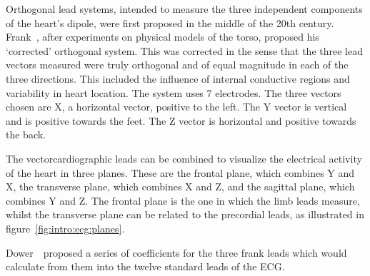 Orthogonal lead systems, intended to measure the three independent components of
the heart's dipole, were first proposed in the middle of the 20th century.
Frank~\cite{Frank1956}, after experiments on physical models of the torso,
proposed his `corrected' orthogonal system.
This was corrected in the sense that the three lead vectors measured were
truly orthogonal and of equal magnitude in each of the three directions.
This included the influence of internal conductive regions and variability in
heart location.
The system uses 7 electrodes.
The three vectors chosen are X, a horizontal vector, positive to the left.
The Y vector is vertical and is positive towards the feet.
The Z vector is horizontal and positive towards the back.

The vectorcardiographic leads can be combined to visualize the electrical
activity of the heart in three planes.
These are the frontal plane, which combines Y and X, the transverse plane, which
combines X and Z, and the sagittal plane, which combines Y and Z.
The frontal plane is the one in which the limb leads measure, whilst the transverse plane
can be related to the precordial leads, as illustrated in
figure~\ref{fig:intro:ecg:planes}.

Dower~\cite{Dower1980}\ proposed a series of coefficients for the three frank
leads which would calculate from them into the twelve standard leads of the ECG.


